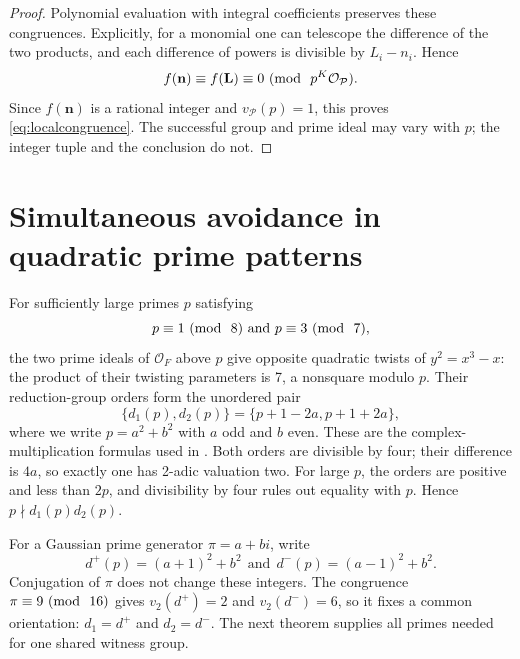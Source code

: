 \documentclass[11pt,reqno]{amsart}
\theoremstyle{definition}
\numberwithin{equation}{section}
\newcommand{\OO}{\mathcal O}
\def\t{\text}
\def\mo{{\rm{mod}\ }}
\def\pmod#1{\ (\mo\ #1)}
\begin{document}
\begin{proof}
Polynomial evaluation with integral coefficients preserves these congruences. Explicitly, for a monomial one can telescope the difference of the two products, and each difference of powers is divisible by $L_i-n_i$. Hence
\[
 f(\mathbf n)\equiv f(\mathbf L)\equiv0\pmod{p^K\OO_{\mathcal P}}.
\]
Since $f(\mathbf n)$ is a rational integer and $v_{\mathcal P}(p)=1$, this proves \eqref{eq:localcongruence}.  The successful group and prime ideal may vary with $p$; the integer tuple and the conclusion do not.
\end{proof}

\section{Simultaneous avoidance in quadratic prime patterns}\label{sec:primes}

For sufficiently large primes $p$ satisfying
\begin{equation}\label{eq:primecongruences}
 p\equiv1\pmod8\ \t{and}\  p\equiv3\pmod7,
\end{equation}
the two prime ideals of $\OO_F$ above $p$ give opposite quadratic twists of $y^2=x^3-x$: the product of their twisting parameters is 7, a nonsquare modulo $p$. Their reduction-group orders form the unordered pair
\begin{equation}\label{eq:orders}
 \{d_1(p),d_2(p)\}=\{p+1-2a,p+1+2a\},
\end{equation}
where we write $p=a^2+b^2$ with $a$ odd and $b$ even.
These are the complex-multiplication formulas used in \cite[Section 6.1]{OAI}. Both orders are divisible by four; their difference is $4a$, so exactly one has 2-adic valuation two. For large $p$, the orders are positive and less than $2p$, and divisibility by four rules out equality with $p$. Hence $p\nmid d_1(p)d_2(p)$.

For a Gaussian prime generator $\pi=a+bi$, write
\begin{equation}\label{an:eq:orders}
 d^+(p)=(a+1)^2+b^2\ \ \t{and}\ \  d^-(p)=(a-1)^2+b^2.
\end{equation}
Conjugation of $\pi$ does not change these integers. The congruence $\pi\equiv9\pmod{16}$ gives $v_2(d^+)=2$ and $v_2(d^-)=6$, so it fixes a common orientation: $d_1=d^+$ and $d_2=d^-$. The next theorem supplies all primes needed for one shared witness group.
\end{document}
